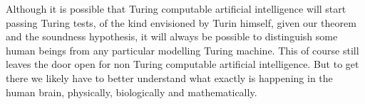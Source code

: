 \documentclass[9pt,twocolumn,twoside,lineno]{pnas-new}
\numberwithin{equation}{section}
\theoremstyle{definition}
\theoremstyle{remark}
\newtheorem{question}{Question}
\begin{document}
 Although it is possible that Turing computable 
artificial intelligence will start passing Turing tests, of the kind envisioned by Turin himself, given our theorem and the soundness hypothesis, it 
will always be possible to distinguish some human beings from any particular 
modelling Turing machine. 
This of course still leaves the door open for non Turing computable artificial intelligence.  But to get there we likely have to better understand what exactly is happening in the human brain, physically, biologically and mathematically.
%
%
%
%

\showacknow{} %

% 
%   
 
%  
\end{document}
